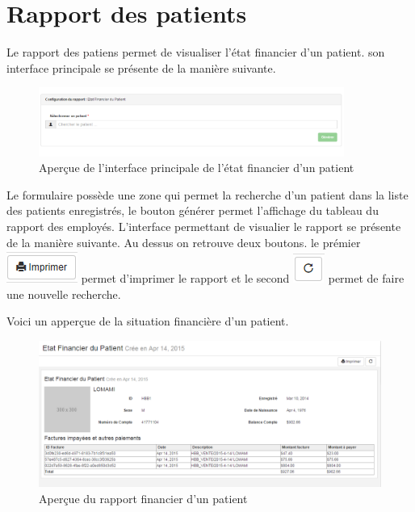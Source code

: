 \documentclass[12pt,a4paper]{report}
\begin{document}
\newpage
\section{Rapport des patients}
Le rapport des patiens permet de visualiser l'état financier d'un patient. son interface principale se présente de la manière suivante. 

\begin{figure}[h]
\begin{center}
\includegraphics[width=10cm]{pic/EtatFInPat.png}
\end{center}
\caption{Aperçue de l'interface principale de l'état financier d'un patient}
\label{Aperçue de l'interface principale de l'état financier d'un patient}
\end{figure}

Le formulaire possède une zone qui permet la recherche d'un patient dans la liste des patients enregistrés, le bouton générer permet l'affichage du tableau du rapport des employés. L'interface permettant de visualier le rapport se présente de la manière suivante. Au dessus on retrouve deux boutons. le prémier 
\includegraphics[scale=0.7]{pic/Print.png} permet d'imprimer le rapport et le second \includegraphics[scale=0.7]{pic/refresh.png} permet de faire une nouvelle recherche.

Voici un apperçue de la situation financière d'un patient.

\begin{figure}[h]
\begin{center}
\includegraphics[width=14cm]{pic/RapEtFinPatient.png}
\end{center}
\caption{Aperçue du rapport financier d'un patient}
\label{Aperçue du rapport financier d'un patient}
\end{figure}
\end{document}
